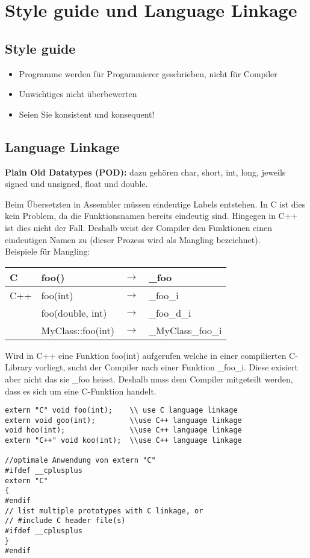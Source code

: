 \section{Style guide und Language Linkage}
\subsection{Style guide}
\begin{itemize}
	\item Programme werden für Progammierer geschrieben, nicht für Compiler
	\item Unwichtiges nicht überbewerten
	\item Seien Sie konsistent und konsequent!
\end{itemize}


\subsection{Language Linkage}
  \textbf{Plain Old Datatypes (POD):} dazu gehören char, short, int, long, jeweils signed und unsigned, float und double.
  
  Beim Übersetzten in Assembler müssen eindeutige Labels entstehen. In C ist dies kein Problem,
  da die Funktionsnamen bereits eindeutig sind. Hingegen in C++ ist dies nicht der Fall. Deshalb weist der
  Compiler den Funktionen einen eindeutigen Namen zu (dieser Prozess wird als Mangling bezeichnet).\\
  
  Beispiele für Mangling:\\
  \begin{tabular}{|l|lll|}
  \hline
    C   & foo() & $\rightarrow$ & \_foo \\
  \hline
    C++ & foo(int) & $\rightarrow$ & \_foo\_i \\
        & foo(double, int) & $\rightarrow$ & \_foo\_d\_i \\
        & MyClass::foo(int) & $\rightarrow$ & \_MyClass\_foo\_i \\
  \hline
  \end{tabular}
  
  Wird in C++ eine Funktion foo(int) aufgerufen welche in einer compilierten C-Library vorliegt, sucht der
  Compiler nach einer Funktion \_foo\_i. Diese exisiert aber nicht das sie \_foo heisst. Deshalb muss dem Compiler
  mitgeteilt werden, dass es sich um eine C-Funktion handelt.\\
  
\begin{lstlisting}[style=Cpp]
extern "C" void foo(int);    \\ use C language linkage
extern void goo(int);        \\use C++ language linkage
void hoo(int);               \\use C++ language linkage
extern "C++" void koo(int);  \\use C++ language linkage

//optimale Anwendung von extern "C"
#ifdef __cplusplus
extern "C"
{
#endif
// list multiple prototypes with C linkage, or
// #include C header file(s)
#ifdef __cplusplus
}
#endif
\end{lstlisting}

